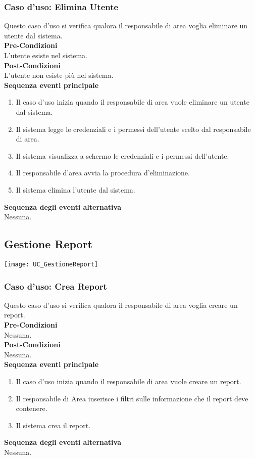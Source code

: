 \documentclass[green, fancy, 11pt]{elegantbook}
\begin{document}
\subsubsection{Caso d'uso: Elimina Utente}
\noindent
Questo caso d’uso si verifica qualora il responsabile di area voglia eliminare un utente dal sistema.\\
\textbf{Pre-Condizioni}\\
L’utente esiste nel sistema.\\
\textbf{Post-Condizioni}\\
L’utente non esiste più nel sistema.\\
\textbf{Sequenza eventi principale}
\begin{enumerate}
	\item Il caso d’uso inizia quando il responsabile di area vuole eliminare un utente dal sistema.
	\item Il sistema legge le credenziali e i permessi dell’utente scelto dal responsabile di area.
	\item Il sistema visualizza a schermo le credenziali e i permessi dell’utente.
	\item Il responsabile d’area avvia la procedura d’eliminazione.
	\item Il sistema elimina l’utente dal sistema.
\end{enumerate}
\textbf{Sequenza degli eventi alternativa}\\
Nessuna.\\

\subsection{Gestione Report}
\texttt{[image: UC\_GestioneReport]}

\subsubsection{Caso d’uso: Crea Report}
\noindent
Questo caso d’uso si verifica qualora il responsabile di area voglia creare un report.\\
\textbf{Pre-Condizioni}\\
Nessuna.\\
\textbf{Post-Condizioni}\\
Nessuna.\\
\textbf{Sequenza eventi principale}
\begin{enumerate}
	\item Il caso d’uso inizia quando il responsabile di area vuole creare un report.
	\item Il responsabile di Area inserisce i filtri sulle informazione che il report deve contenere.
	\item Il sistema crea il report.
\end{enumerate}
\textbf{Sequenza degli eventi alternativa}\\
Nessuna.
\end{document}
